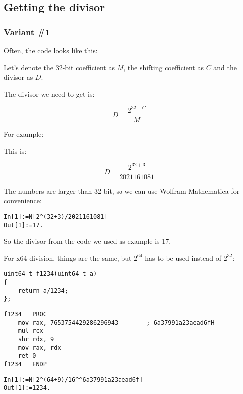 ﻿\subsection{Getting the divisor}

\subsubsection{Variant \#1}

Often, the code looks like this:



Let's denote the 32-bit  coefficient as $M$, the shifting coefficient as $C$ and the divisor as $D$.

The divisor we need to get is:

\[
D=\frac{2^{32 + C}}{M}
\]

For example:



This is:

\[
D=\frac{2^{32 + 3}}{2021161081}
\]


The numbers are larger than 32-bit, so we can use Wolfram Mathematica for convenience:

\begin{lstlisting}[caption=Wolfram Mathematica]
In[1]:=N[2^(32+3)/2021161081]
Out[1]:=17.
\end{lstlisting}

So the divisor from the code we used as example is 17.

For x64 division, things 
are the same, but $2^{64}$ has to be used instead of $2^{32}$:

\begin{lstlisting}
uint64_t f1234(uint64_t a)
{
	return a/1234;
};
\end{lstlisting}

\begin{lstlisting}[caption=\Optimizing MSVC 2012 x64]
f1234	PROC
	mov	rax, 7653754429286296943		; 6a37991a23aead6fH
	mul	rcx
	shr	rdx, 9
	mov	rax, rdx
	ret	0
f1234	ENDP
\end{lstlisting}

\begin{lstlisting}[caption=Wolfram Mathematica]
In[1]:=N[2^(64+9)/16^^6a37991a23aead6f]
Out[1]:=1234.
\end{lstlisting}

